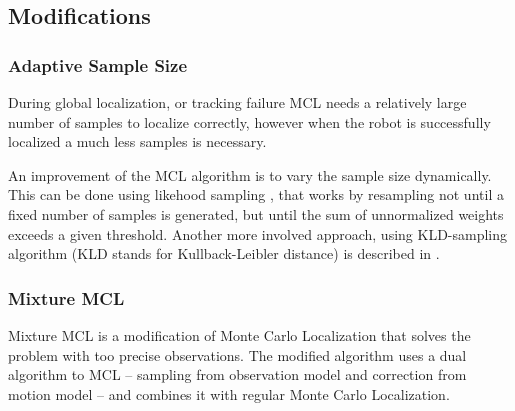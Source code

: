 \subsection{Modifications}

\subsubsection{Adaptive Sample Size}
During global localization, or tracking failure MCL needs a relatively large number
of samples to localize correctly, however when the robot is successfully localized
a much less samples is necessary.

An improvement of the MCL algorithm is to vary the sample size dynamically.
This can be done using likehood sampling \cite{fox99}, that works by 
resampling not until a fixed number of samples is
generated, but until the sum of unnormalized weights exceeds a given threshold.
Another more involved approach, using KLD-sampling algorithm
(KLD stands for Kullback-Leibler distance) is described in \cite{fox03}.


\subsubsection{Mixture MCL}

Mixture MCL \cite{thrun99} is a modification of Monte Carlo Localization that
solves the problem with too precise observations.
The modified algorithm uses a dual algorithm to MCL -- sampling from
observation model and correction from motion model -- and combines it with
regular Monte Carlo Localization.

